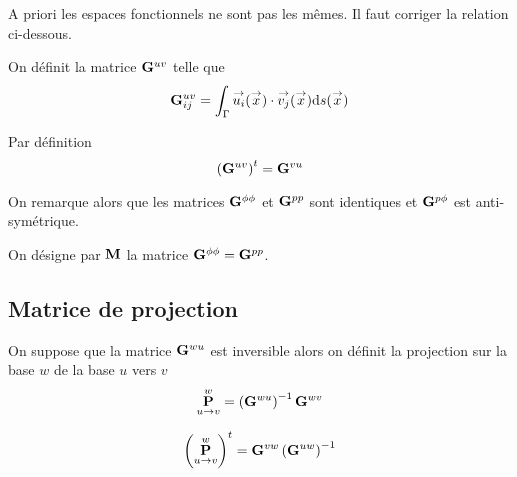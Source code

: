     \begin{TODO}
      A priori les espaces fonctionnels ne sont pas les mêmes. Il faut corriger la relation ci-dessous.
    \end{TODO}

    \begin{defn}
      On définit la matrice \(\mG{u}{v}\) telle que
      \begin{equation}
        \mG{u}{v}_{ij} = \int_\Gamma \vect{u_i}(\vx)\cdot \vect{v_j}(\vx) \dd{s}(\vx)
      \end{equation}
    \end{defn}

    \begin{prop}
      Par définition
      \begin{equation}
        \left(\mG{u}{v}\right)^t = \mG{v}{u}
      \end{equation}
    \end{prop}

    On remarque alors que les matrices \(\mG{\phi}{\phi}\) et \(\mG{p}{p}\) sont identiques et \(\mG{p}{\phi}\) est anti-symétrique.

    \begin{defn}
      On désigne par \(\mM\) la matrice \(\mG{\phi}{\phi} = \mG{p}{p}\).
    \end{defn}


  \subsection{Matrice de projection}

    \begin{defn}
      On suppose que la matrice \(\mG{w}{u}\) est inversible alors on définit la projection sur la base \(w\) de la base \(u\) vers \(v\)
      \begin{equation}
        \mP{u}{v}{w} = \left(\mG{w}{u}\right)^{-1}\mG{w}{v}
      \end{equation}
    \end{defn}

    \begin{prop}
      \begin{equation}
        \left(\mP{u}{v}{w}\right)^t = \mG{v}{w}\left(\mG{u}{w}\right)^{-1}
      \end{equation}
    \end{prop}

